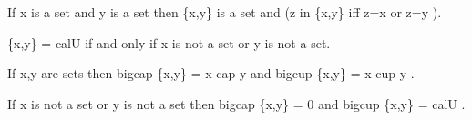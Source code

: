 \documentclass[a4paper,draft]{amsproc}
\begin{document}
\begin{forthel}
\begin{theorem}
If  x  is a set and  y  is a set 
then  \{x,y\}  is a set and  (z in \{x,y\}  iff  z=x  or  z=y ). 
\end{theorem}

\begin{theorem}
 \{x,y\} = cal{U}  if and only if  x  is not a set or  y  is not a set.
\end{theorem}

\begin{theorem}
If  x,y  are sets then  bigcap \{x,y\} = x cap y 
and  bigcup \{x,y\} = x cup y .
\end{theorem}

\begin{theorem}
If  x  is not a set or  y  is not a set then
 bigcap \{x,y\} = 0  and  bigcup \{x,y\} = cal{U} .
\end{theorem}
\end{forthel}
\end{document}
